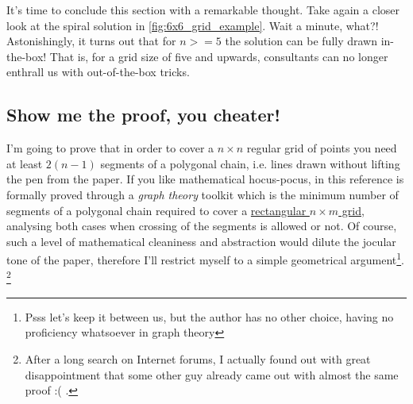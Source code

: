 \documentclass[11pt]{article}
\begin{document}
It's time to conclude this section with a remarkable thought. Take again a closer look at the spiral solution in \autoref{fig:6x6_grid_example}. Wait a minute, what?! Astonishingly, it turns out that for $n >= 5$ the solution can be fully drawn in-the-box! That is, for a grid size of five and upwards, consultants can no longer enthrall us with out-of-the-box tricks.


\hypertarget{proof-extended-solution} {
	\subsection{Show me the proof, you cheater!}
	\label{proof-extended-solution}
}

I'm going to prove that in order to cover a $n\times n$ regular grid of points you need at least $2(n - 1)$ segments of a polygonal chain, i.e. lines drawn without lifting the pen from the paper. If you like mathematical hocus-pocus, in this reference\cite{covering-path-paper} is formally proved through a \emph{graph theory} toolkit which is the minimum number of segments of a polygonal chain required to cover a \underline{rectangular $n\times m$ grid}, analysing both cases when crossing of the segments is allowed or not. Of course, such a level of mathematical cleaniness and abstraction would dilute the jocular tone of the paper, therefore I'll restrict myself to a simple geometrical argument\footnote{Psss let's keep it between us, but the author has no other choice, having no proficiency whatsoever in graph theory}. \footnote{After a long search on Internet forums, I actually found out with great disappointment that some other guy already came out with almost the same proof :( \cite{math-stackexchange-squared-grid-proof}.}
\end{document}
